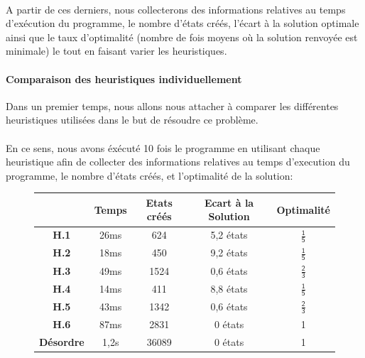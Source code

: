 \documentclass[10pt,a4paper]{report}
\begin{document}
\paragraph{}{A partir de ces derniers, nous collecterons des informations relatives au temps d'exécution du programme, le nombre d'états créés, l'écart à la solution optimale ainsi que le taux d'optimalité (nombre de fois moyens où la solution renvoyée est minimale) le tout en faisant varier les heuristiques.}

\paragraph{Comparaison des heuristiques individuellement}{Dans un premier temps, nous allons nous attacher à comparer les différentes heuristiques utilisées dans le but de résoudre ce problème.}
\paragraph{}{En ce sens, nous avons éxécuté 10 fois le programme en utilisant chaque heuristique afin de collecter des informations relatives au temps d'execution du programme, le nombre d'états créés, et l'optimalité de la solution:}
{\scriptsize{}
\renewcommand{\arraystretch}{1.3}
\vspace*{.5cm}
\begin{figure}[h!]
\centering
\begin{tabular}{| c | c | c | c | c |} \hline
\textbf{ } & \textbf{Temps} & \textbf{Etats créés} & \textbf{Ecart à la Solution} & \textbf{Optimalité} \\ \hline
\textbf{H.1} & 26ms & 624 & 5,2 états & $\mathsf{\tfrac{1}{5}}$ \\ \hline
\textbf{H.2} & 18ms & 450 & 9,2 états & $\mathsf{\tfrac{1}{5}}$ \\ \hline
\textbf{H.3} & 49ms & 1524 & 0,6 états & $\mathsf{\tfrac{2}{3}}$ \\ \hline
\textbf{H.4} & 14ms & 411 & 8,8 états & $\mathsf{\tfrac{1}{5}}$ \\ \hline
\textbf{H.5} & 43ms & 1342 & 0,6 états & $\mathsf{\tfrac{2}{3}}$ \\ \hline
\textbf{H.6} & 87ms & 2831 & 0 états & 1 \\ \hline
\textbf{Désordre} & 1,2s & 36089 & 0 états & 1 \\ \hline
\end{tabular}
\end{figure}
\vspace*{.5cm}
}
\end{document}
